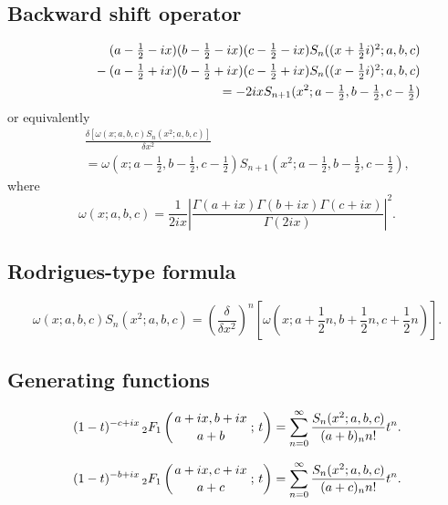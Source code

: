 \documentclass[envcountchap,graybox]{svmono}
\newcommand{\hyp}[5]{\mbox{}_{#1}{F}_{#2}
\left(\genfrac{}{}{0pt}{}{#3}{#4}\,;\,#5\right)}
\newcommand{\mathindent}{\hspace{7.5mm}}
\renewcommand{\Gamma}{\varGamma}
\begin{document}
\subsection*{Backward shift operator}
\begin{eqnarray}
\label{shift2ContDualHahnI}
& &(a-\textstyle\frac{1}{2}-ix)(b-\textstyle\frac{1}{2}-ix)
(c-\textstyle\frac{1}{2}-ix) S_n((x+\textstyle\frac{1}{2}i)^2;a,b,c)\nonumber\\
& &{}\mathindent{}-(a-\textstyle\frac{1}{2}+ix)(b-\textstyle\frac{1}{2}+ix)
(c-\textstyle\frac{1}{2}+ix) S_n((x-\textstyle\frac{1}{2}i)^2;a,b,c)\nonumber\\
& &{}=-2ixS_{n+1}(x^2;a-\textstyle\frac{1}{2},b-\textstyle\frac{1}{2},
c-\textstyle\frac{1}{2})
\end{eqnarray}
or equivalently
\begin{eqnarray}
\label{shift2ContDualHahnII}
& &\frac{\delta\left[\omega(x;a,b,c)S_n(x^2;a,b,c)\right]}{\delta x^2}\nonumber\\
& &{}=\omega(x;a-\textstyle\frac{1}{2},b-\textstyle\frac{1}{2},c-\textstyle\frac{1}{2})
S_{n+1}(x^2;a-\textstyle\frac{1}{2},b-\textstyle\frac{1}{2},c-\textstyle\frac{1}{2}),
\end{eqnarray}
where
$$\omega(x;a,b,c)=\frac{1}{2ix}\left|\frac{\Gamma(a+ix)\Gamma(b+ix)\Gamma(c+ix)}{\Gamma(2ix)}\right|^2.$$

\subsection*{Rodrigues-type formula}
\begin{equation}
\label{RodContDualHahn}
\omega(x;a,b,c)S_n(x^2;a,b,c)=
\left(\frac{\delta}{\delta x^2}\right)^n\left[\omega(x;a+\textstyle\frac{1}{2}n,
b+\textstyle\frac{1}{2}n,c+\textstyle\frac{1}{2}n)\right].
\end{equation}

\subsection*{Generating functions}
\begin{equation}
\label{GenContDualHahn1}
(1-t)^{-c+ix}\,\hyp{2}{1}{a+ix,b+ix}{a+b}{t}
=\sum_{n=0}^{\infty}\frac{S_n(x^2;a,b,c)}{(a+b)_nn!}t^n.
\end{equation}

\begin{equation}
\label{GenContDualHahn2}
(1-t)^{-b+ix}\,\hyp{2}{1}{a+ix,c+ix}{a+c}{t}
=\sum_{n=0}^{\infty}\frac{S_n(x^2;a,b,c)}{(a+c)_nn!}t^n.
\end{equation}
\end{document}
